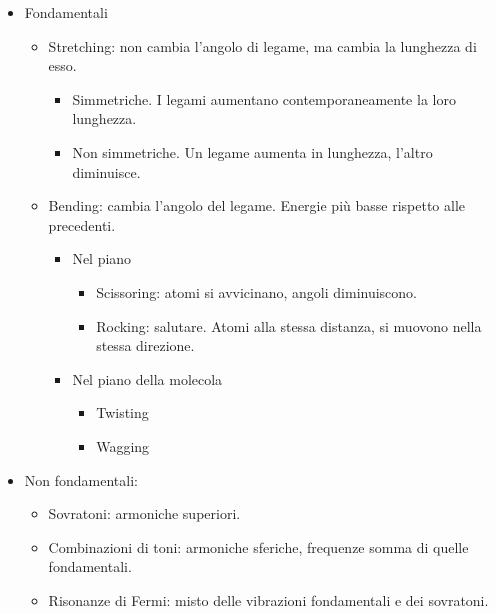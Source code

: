 \begin{itemize}
\item
  Fondamentali

  \begin{itemize}
  \item
    Stretching: non cambia l'angolo di legame, ma cambia la lunghezza di
    esso.

    \begin{itemize}
    \item
      Simmetriche. I legami aumentano contemporaneamente la loro
      lunghezza.
    \item
      Non simmetriche. Un legame aumenta in lunghezza, l'altro
      diminuisce.
    \end{itemize}
  \item
    Bending: cambia l'angolo del legame. Energie più basse rispetto alle
    precedenti.

    \begin{itemize}
    \item
      Nel piano

      \begin{itemize}
      \item
        Scissoring: atomi si avvicinano, angoli diminuiscono.
      \item
        Rocking: salutare. Atomi alla stessa distanza, si muovono nella
        stessa direzione.
      \end{itemize}
    \item
      Nel piano della molecola

      \begin{itemize}
      \item
        Twisting
      \item
        Wagging
      \end{itemize}
    \end{itemize}
  \end{itemize}
\item
  Non fondamentali:

  \begin{itemize}
  \item
    Sovratoni: armoniche superiori.
  \item
    Combinazioni di toni: armoniche sferiche, frequenze somma di quelle
    fondamentali.
  \item
    Risonanze di Fermi: misto delle vibrazioni fondamentali e dei
    sovratoni.
  \end{itemize}
\end{itemize}

